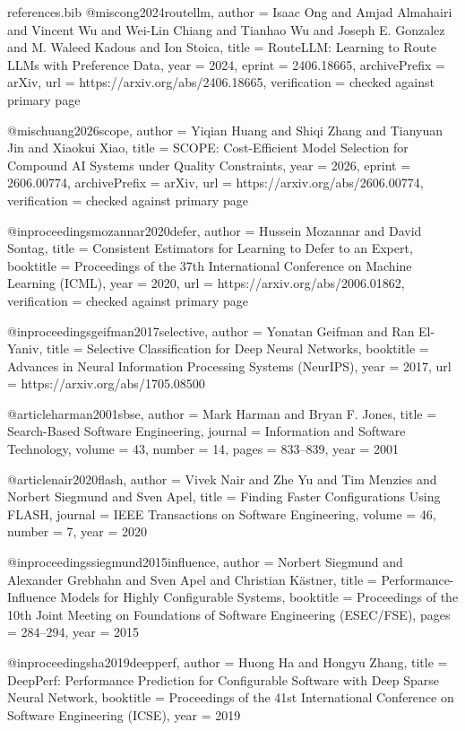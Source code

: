 \begin{filecontents*}[overwrite]{references.bib}
@misc{ong2024routellm,
  author = {Isaac Ong and Amjad Almahairi and Vincent Wu and Wei-Lin Chiang and Tianhao Wu and Joseph E. Gonzalez and M. Waleed Kadous and Ion Stoica},
  title = {{RouteLLM}: Learning to Route {LLMs} with Preference Data},
  year = {2024},
  eprint = {2406.18665},
  archivePrefix = {arXiv},
  url = {https://arxiv.org/abs/2406.18665},
  verification = {checked against primary page}
}

@misc{huang2026scope,
  author = {Yiqian Huang and Shiqi Zhang and Tianyuan Jin and Xiaokui Xiao},
  title = {{SCOPE}: Cost-Efficient Model Selection for Compound {AI} Systems under Quality Constraints},
  year = {2026},
  eprint = {2606.00774},
  archivePrefix = {arXiv},
  url = {https://arxiv.org/abs/2606.00774},
  verification = {checked against primary page}
}

@inproceedings{mozannar2020defer,
  author = {Hussein Mozannar and David Sontag},
  title = {Consistent Estimators for Learning to Defer to an Expert},
  booktitle = {Proceedings of the 37th International Conference on Machine Learning (ICML)},
  year = {2020},
  url = {https://arxiv.org/abs/2006.01862},
  verification = {checked against primary page}
}

@inproceedings{geifman2017selective,
  author = {Yonatan Geifman and Ran El-Yaniv},
  title = {Selective Classification for Deep Neural Networks},
  booktitle = {Advances in Neural Information Processing Systems (NeurIPS)},
  year = {2017},
  url = {https://arxiv.org/abs/1705.08500}
}

@article{harman2001sbse,
  author = {Mark Harman and Bryan F. Jones},
  title = {Search-Based Software Engineering},
  journal = {Information and Software Technology},
  volume = {43},
  number = {14},
  pages = {833--839},
  year = {2001}
}

@article{nair2020flash,
  author = {Vivek Nair and Zhe Yu and Tim Menzies and Norbert Siegmund and Sven Apel},
  title = {Finding Faster Configurations Using {FLASH}},
  journal = {IEEE Transactions on Software Engineering},
  volume = {46},
  number = {7},
  year = {2020}
}

@inproceedings{siegmund2015influence,
  author = {Norbert Siegmund and Alexander Grebhahn and Sven Apel and Christian K{\"a}stner},
  title = {Performance-Influence Models for Highly Configurable Systems},
  booktitle = {Proceedings of the 10th Joint Meeting on Foundations of Software Engineering (ESEC/FSE)},
  pages = {284--294},
  year = {2015}
}

@inproceedings{ha2019deepperf,
  author = {Huong Ha and Hongyu Zhang},
  title = {{DeepPerf}: Performance Prediction for Configurable Software with Deep Sparse Neural Network},
  booktitle = {Proceedings of the 41st International Conference on Software Engineering (ICSE)},
  year = {2019}
}


\end{filecontents*}
